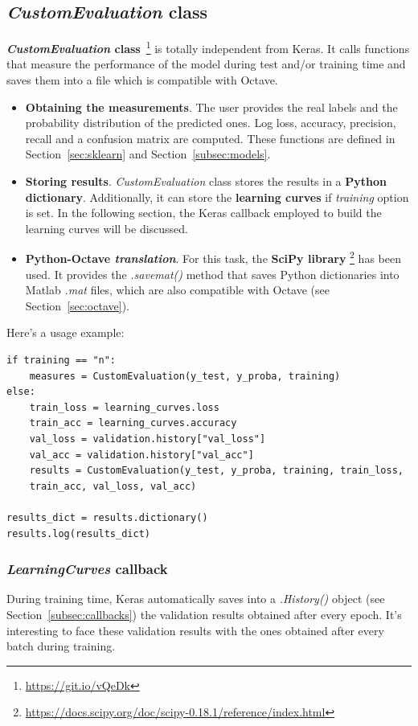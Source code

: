 \subsection{\textit{CustomEvaluation} class}
\textbf{\textit{CustomEvaluation} class}~\footnote{\url{https://git.io/vQeDk}} is totally independent from Keras. It calls functions that measure the performance of the model during test and/or training time and saves them into a file which is compatible with Octave.
\begin{itemize}
	\item \textbf{Obtaining the measurements}. The user provides the real labels and the probability distribution of the predicted ones. Log loss, accuracy, precision, recall and a confusion matrix are computed. These functions are defined in Section~\ref{sec:sklearn} and Section~\ref{subsec:models}.
	\item \textbf{Storing results}. \textit{CustomEvaluation} class stores the results in a \textbf{Python dictionary}. Additionally, it can store the \textbf{learning curves} if \textit{training} option is set. In the following section, the Keras callback employed to build the learning curves will be discussed.
	\item \textbf{Python-Octave \textit{translation}}. For this task, the \textbf{SciPy library} \footnote{\url{https://docs.scipy.org/doc/scipy-0.18.1/reference/index.html}} has been used. It provides the \textit{.savemat()} method that saves Python dictionaries into Matlab \textit{.mat} files, which are also compatible with Octave (see Section~\ref{sec:octave}).
\end{itemize}

Here's a usage example:
\begin{lstlisting}
if training == "n":
	measures = CustomEvaluation(y_test, y_proba, training)
else:
	train_loss = learning_curves.loss
	train_acc = learning_curves.accuracy
	val_loss = validation.history["val_loss"]
	val_acc = validation.history["val_acc"]
	results = CustomEvaluation(y_test, y_proba, training, train_loss,
	train_acc, val_loss, val_acc)

results_dict = results.dictionary()
results.log(results_dict)
\end{lstlisting}

\subsubsection{\textit{LearningCurves} callback} \label{subsubsec:learningcurves}
During training time, Keras automatically saves into a \textit{.History()} object (see Section~\ref{subsec:callbacks}) the validation results obtained after every epoch. It's interesting to face these validation results with the ones obtained after every batch during training.

